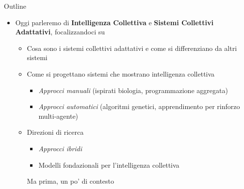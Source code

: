 \documentclass[presentation, 10pt,aspectratio=169]{beamer}\mode<presentation>{\usetheme{AMSBolognaFC}}
\begin{document}
\begin{frame}{Outline}
	\begin{itemize}
		\item Oggi parleremo di \alert{\textbf{Intelligenza Collettiva}} e \alert{\textbf{Sistemi Collettivi Adattativi}}, focalizzandoci su
		\begin{itemize}
			\item Cosa sono i sistemi collettivi adattativi e come si differenziano da altri sistemi
			\item Come si progettano sistemi che mostrano intelligenza collettiva
			\begin{itemize}
				\item \emph{Approcci manuali} (ispirati biologia, programmazione aggregata)
				\item \emph{Approcci automatici} (algoritmi genetici, apprendimento per rinforzo multi-agente)
			\end{itemize}
			\item Direzioni di ricerca
			\begin{itemize}
				\item \emph{Approcci ibridi}
				\item Modelli fondazionali per l'intelligenza collettiva
			\end{itemize}
			Ma prima, un po' di contesto \alert{\faSmileO}
		\end{itemize}
	\end{itemize}
\end{frame}
\end{document}
